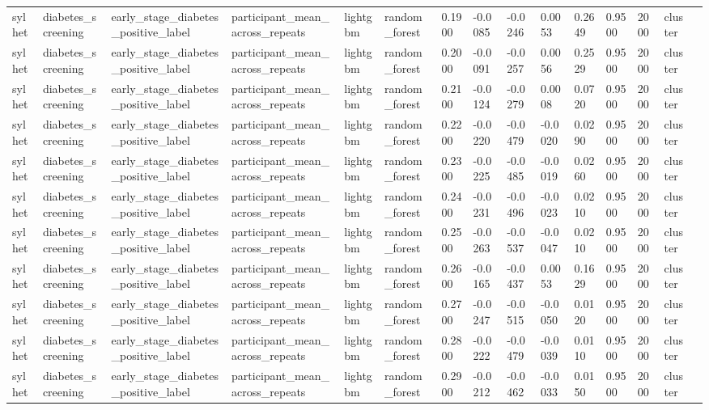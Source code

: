 \begin{tabular}{lllllllllllllll}
sylhet & diabetes\_screening & early\_stage\_diabetes\_positive\_label & participant\_mean\_across\_repeats & lightgbm & random\_forest & 0.1900 & -0.0085 & -0.0246 & 0.0053 & 0.2649 & 0.9500 & 2000 & cluster &  \\
sylhet & diabetes\_screening & early\_stage\_diabetes\_positive\_label & participant\_mean\_across\_repeats & lightgbm & random\_forest & 0.2000 & -0.0091 & -0.0257 & 0.0056 & 0.2529 & 0.9500 & 2000 & cluster &  \\
sylhet & diabetes\_screening & early\_stage\_diabetes\_positive\_label & participant\_mean\_across\_repeats & lightgbm & random\_forest & 0.2100 & -0.0124 & -0.0279 & 0.0008 & 0.0720 & 0.9500 & 2000 & cluster &  \\
sylhet & diabetes\_screening & early\_stage\_diabetes\_positive\_label & participant\_mean\_across\_repeats & lightgbm & random\_forest & 0.2200 & -0.0220 & -0.0479 & -0.0020 & 0.0290 & 0.9500 & 2000 & cluster &  \\
sylhet & diabetes\_screening & early\_stage\_diabetes\_positive\_label & participant\_mean\_across\_repeats & lightgbm & random\_forest & 0.2300 & -0.0225 & -0.0485 & -0.0019 & 0.0260 & 0.9500 & 2000 & cluster &  \\
sylhet & diabetes\_screening & early\_stage\_diabetes\_positive\_label & participant\_mean\_across\_repeats & lightgbm & random\_forest & 0.2400 & -0.0231 & -0.0496 & -0.0023 & 0.0210 & 0.9500 & 2000 & cluster &  \\
sylhet & diabetes\_screening & early\_stage\_diabetes\_positive\_label & participant\_mean\_across\_repeats & lightgbm & random\_forest & 0.2500 & -0.0263 & -0.0537 & -0.0047 & 0.0210 & 0.9500 & 2000 & cluster &  \\
sylhet & diabetes\_screening & early\_stage\_diabetes\_positive\_label & participant\_mean\_across\_repeats & lightgbm & random\_forest & 0.2600 & -0.0165 & -0.0437 & 0.0053 & 0.1629 & 0.9500 & 2000 & cluster &  \\
sylhet & diabetes\_screening & early\_stage\_diabetes\_positive\_label & participant\_mean\_across\_repeats & lightgbm & random\_forest & 0.2700 & -0.0247 & -0.0515 & -0.0050 & 0.0120 & 0.9500 & 2000 & cluster &  \\
sylhet & diabetes\_screening & early\_stage\_diabetes\_positive\_label & participant\_mean\_across\_repeats & lightgbm & random\_forest & 0.2800 & -0.0222 & -0.0479 & -0.0039 & 0.0110 & 0.9500 & 2000 & cluster &  \\
sylhet & diabetes\_screening & early\_stage\_diabetes\_positive\_label & participant\_mean\_across\_repeats & lightgbm & random\_forest & 0.2900 & -0.0212 & -0.0462 & -0.0033 & 0.0150 & 0.9500 & 2000 & cluster &  \\

\end{tabular}
